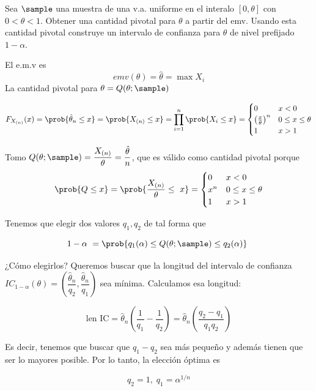 \pagebreak
\begin{problem}[6]
Sea $\sample$ una muestra de una v.a. uniforme en el interalo $[0,\theta]$ con $0 < \theta < 1$. Obtener una cantidad pivotal para $\theta$ a partir del emv. Usando esta cantidad pivotal construye un intervalo de confianza para $\theta$ de nivel prefijado $1-\alpha$.

\solution

El e.m.v es \[ emv (\theta) = \hat{\theta} = \max X_i \] La cantidad pivotal para $\theta = Q(\theta; \sample)$

\[ F_{X_{(n)}} (x) = \prob{\hat{\theta}_n \leq x} = \prob{X_{(n)} \leq x} = \prod_{i=1}^{n} \prob{X_i \leq x} = \begin{cases}
0& x<0 \\
\left( \frac{x}{\theta} \right)^n & 0\leq x \leq \theta \\
1 & x > 1
\end{cases}\]

Tomo $Q(\theta; \sample ) = \dfrac{X_{(n)}}{\theta} = \dfrac{\hat{\theta}}{n}$, que es válido como cantidad pivotal porque \[ \prob{Q \leq x} = \prob{\frac{X_{(n)}}{\theta} \leq x} = \begin{cases}
0 & x<0 \\
x^n & 0\leq x \leq \theta \\
1 & x > 1
\end{cases} \]

Tenemos que elegir dos valores $q_1, q_2$ de tal forma que 

\[ 1- \alpha = \prob{q_1(\alpha) \leq Q(\theta;\sample) \leq q_2(\alpha)} \]

¿Cómo elegirlos? Queremos buscar que la longitud del intervalo de confianza $IC_{1-\alpha}(\theta) = \left(\dfrac{\hat{\theta}_n}{q_2},\dfrac{\hat{\theta}_n}{q_1}\right)$ sea mínima. Calculamos esa longitud:

\[ \text{len IC} = \hat{\theta}_n\left(\frac{1}{q_1}-\frac{1}{q_2}\right)=\hat{\theta}_n \left(\frac{q_2-q_1}{q_1q_2}\right) \]

Es decir, tenemos que buscar que $q_1-q_2$ sea más pequeño y además tienen que ser lo mayores posible. Por lo tanto, la elección óptima es 

\[ q_2 = 1,\;q_1=\alpha^{1/n} \]

\end{problem}



